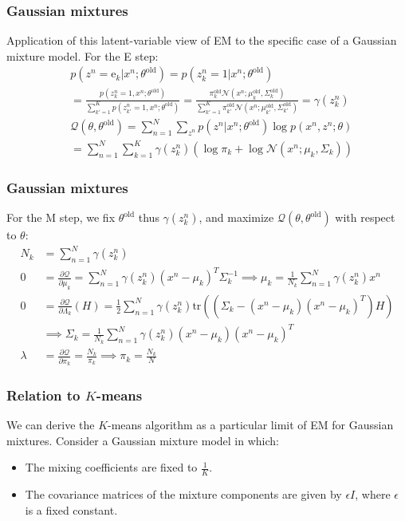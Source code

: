\documentclass{beamer}
\begin{document}
\begin{frame}
    \frametitle{Gaussian mixtures}
    Application of this latent-variable view of EM to the specific case of a Gaussian mixture model. For the E step:
    \begin{align*}
        &p(z^{n}=\mathrm{e}_{k}|x^{n};\theta^{\textrm{old}})=p(z^{n}_{k}=1|x^{n};\theta^{\textrm{old}}) \\
        &=\frac{p(z^{n}_{k}=1,x^{n};\theta^{\textrm{old}})}{\sum_{k'=1}^{K}p(z^{n}_{k'}=1,x^{n};\theta^{\textrm{old}})}=\frac{\pi_{k}^{\textrm{old}}\mathcal{N}(x^{n};\mu_{k}^{\textrm{old}},\Sigma_{k}^{\textrm{old}})}{\sum_{k'=1}^{K}\pi_{k'}^{\textrm{old}}\mathcal{N}(x^{n};\mu_{k'}^{\textrm{old}},\Sigma_{k'}^{\textrm{old}})}=\gamma(z^{n}_{k}) \\
        &\mathcal{Q}(\theta,\theta^{\textrm{old}})=\sum_{n=1}^{N}\sum_{z^{n}}p(z^{n}|x^{n};\theta^{\textrm{old}})\log{}p(x^{n},z^{n};\theta) \\
        &=\sum_{n=1}^{N}\sum_{k=1}^{K}\gamma(z^{n}_{k})(\log\pi_{k}+\log\mathcal{N}(x^{n};\mu_{k},\Sigma_{k}))
    \end{align*}
\end{frame}

\begin{frame}
    \frametitle{Gaussian mixtures}
    For the M step, we fix $\theta^{\textrm{old}}$ thus $\gamma(z^{n}_{k})$, and maximize $\mathcal{Q}(\theta,\theta^{\textrm{old}})$ with respect to $\theta$:
    \begin{align*}
        N_{k}&=\sum_{n=1}^{N}\gamma(z^{n}_{k}) \\
        0&=\frac{\partial\mathcal{Q}}{\partial\mu_{k}}=\sum_{n=1}^{N}\gamma(z^{n}_{k})(x^{n}-\mu_{k})^{T}\Sigma_{k}^{-1}\implies\mu_{k}=\frac{1}{N_{k}}\sum_{n=1}^{N}\gamma(z^{n}_{k})x^{n} \\
        0&=\frac{\partial\mathcal{Q}}{\partial\Lambda_{k}}(H)=\frac{1}{2}\sum_{n=1}^{N}\gamma(z^{n}_{k})\mathrm{tr}((\Sigma_{k}-(x^{n}-\mu_{k})(x^{n}-\mu_{k})^{T})H) \\
        &\implies\Sigma_{k}=\frac{1}{N_{k}}\sum_{n=1}^{N}\gamma(z^{n}_{k})(x^{n}-\mu_{k})(x^{n}-\mu_{k})^{T} \\
        \lambda&=\frac{\partial\mathcal{Q}}{\partial\pi_{k}}=\frac{N_{k}}{\pi_{k}}\implies\pi_{k}=\frac{N_{k}}{N}
    \end{align*}
\end{frame}

\begin{frame}
    \frametitle{Relation to $K$-means}
    We can derive the $K$-means algorithm as a particular limit of EM for Gaussian mixtures. Consider a Gaussian mixture model in which:
    \begin{itemize}
        \item The mixing coefficients are fixed to $\frac{1}{K}$.
        \item The covariance matrices of the mixture components are given by $\epsilon{}I$, where $\epsilon$ is a fixed constant.
    \end{itemize}
\end{frame}
\end{document}
